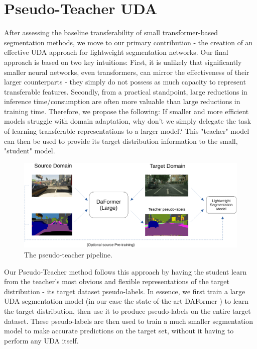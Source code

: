 \documentclass[a4paper,12pt]{report}
\begin{document}
\section{Pseudo-Teacher UDA}
After assessing the baseline transferability of small transformer-based segmentation methods, we move to our primary contribution - the creation of an effective UDA approach for lightweight segmentation networks. Our final approach is based on two key intuitions: First, it is unlikely that significantly smaller neural networks, even transformers, can mirror the effectiveness of their larger counterparts - they simply do not possess as much capacity to represent transferable features. Secondly, from a practical standpoint, large reductions in inference time/consumption are often more valuable than large reductions in training time. Therefore, we propose the following: If smaller and more efficient models struggle with domain adaptation, why don't we simply delegate the task of learning transferable representations to a larger model? This "teacher" model can then be used to provide its target distribution information to the small, "student" model.

\begin{figure}[t]
    \centering
    \includegraphics[width=\textwidth]{res/pseudo-teacher-pipeline.pdf}
    \caption{The pseudo-teacher pipeline.}
    \label{fig:pseudo-teacher-pipeline}
\end{figure}

Our Pseudo-Teacher method follows this approach by having the student learn from the teacher's most obvious and flexible representations of the target distribution - its target dataset pseudo-labels. In essence, we first train a large UDA segmentation model (in our case the state-of-the-art DAFormer \cite{hoyer_daformer_2022}) to learn the target distribution, then use it to produce pseudo-labels on the entire target dataset. These pseudo-labels are then used to train a much smaller segmentation model to make accurate predictions on the target set, without it having to perform any UDA itself.
\end{document}
